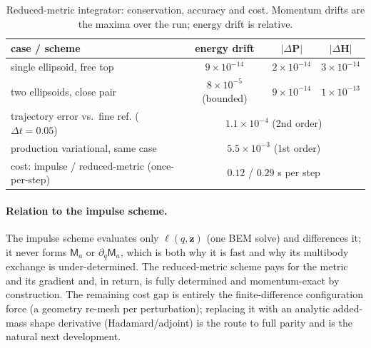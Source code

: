 \documentclass[11pt]{article}
\newcommand{\Ma}{\mathsf{M}_{a}}
\newcommand{\zz}{\mathbf{z}}
\begin{document}
\begin{table}[h]
\centering
\begin{tabular}{lccc}
\toprule
case / scheme & energy drift & $|\Delta\mathbf P|$ & $|\Delta\mathbf H|$ \\
\midrule
single ellipsoid, free top & $9\times10^{-14}$ & $2\times10^{-14}$ & $3\times10^{-14}$\\
two ellipsoids, close pair & $8\times10^{-5}$ (bounded) & $9\times10^{-14}$ & $1\times10^{-13}$\\
\midrule
trajectory error vs.\ fine ref. ($\Delta t{=}0.05$) & \multicolumn{3}{c}{$1.1\times10^{-4}$ (2nd order)}\\
production variational, same case & \multicolumn{3}{c}{$5.5\times10^{-3}$ (1st order)}\\
\midrule
cost: impulse / reduced-metric (once-per-step) & \multicolumn{3}{c}{$0.12$ / $0.29$ s per step}\\
\bottomrule
\end{tabular}
\caption{Reduced-metric integrator: conservation, accuracy and cost.
Momentum drifts are the maxima over the run; energy drift is relative.}
\label{tab:rm-results}
\end{table}

\paragraph{Relation to the impulse scheme.}
The impulse scheme evaluates only $\bm\ell(q,\zz)$ (one BEM solve) and differences
it; it never forms $\Ma$ or $\partial_q\Ma$, which is both why it is fast and why
its multibody exchange is under-determined. The reduced-metric scheme pays for
the metric and its gradient and, in return, is fully determined and
momentum-exact by construction. The remaining cost gap is entirely the
finite-difference configuration force (a geometry re-mesh per perturbation);
replacing it with an analytic added-mass shape derivative (Hadamard/adjoint) is
the route to full parity and is the natural next development.
\end{document}
